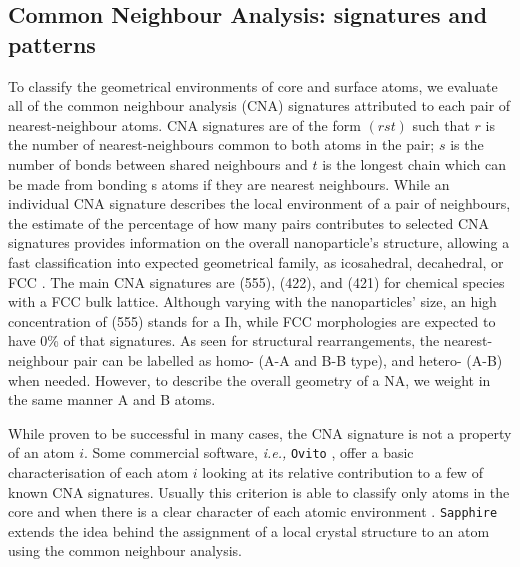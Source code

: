 \subsection{Common Neighbour Analysis: signatures and patterns}
\label{sec:CNA}
%
To classify the geometrical environments of core and surface atoms, we evaluate all of the common neighbour analysis (CNA) signatures attributed to each pair of nearest-neighbour atoms. 
CNA signatures are of the form $(rst)$ such that $r$ is the number of nearest-neighbours common to both atoms in the pair; $s$ is the number of bonds between shared neighbours and $t$ is the longest chain which can be made from bonding s atoms if they are nearest neighbours. 
While an individual CNA signature describes the local environment of a pair of neighbours, the estimate of the percentage of how many pairs contributes to selected CNA signatures provides information on the overall nanoparticle's structure, allowing a fast classification into expected geometrical family, as icosahedral, decahedral, or FCC \cite{Baletto_2019}.
%
The main CNA signatures are (555), (422), and (421) for chemical species with a FCC bulk lattice. Although varying with the nanoparticles' size, an high concentration of (555) stands for a Ih, while FCC morphologies are expected to have 0\% of that signatures.
%
As seen for structural rearrangements, the nearest-neighbour pair can be labelled as homo- (A-A and B-B type), and hetero- (A-B) when needed. However, to describe the overall geometry of a NA, we weight in the same manner A and B atoms.
%

While proven to be successful in many cases, the CNA signature is not a property of an atom $i$.
Some commercial software, \textit{i.e.,} \texttt{Ovito} \cite{ovito}, offer a basic characterisation of each atom $i$ looking at its relative contribution to a few of known CNA signatures. Usually this criterion is able to classify only atoms in the core and when there is a clear character of each atomic environment \cite{Stukowski_2012}.
%
\texttt{Sapphire} extends the idea behind the assignment of a local crystal structure to an atom using the common neighbour analysis.


